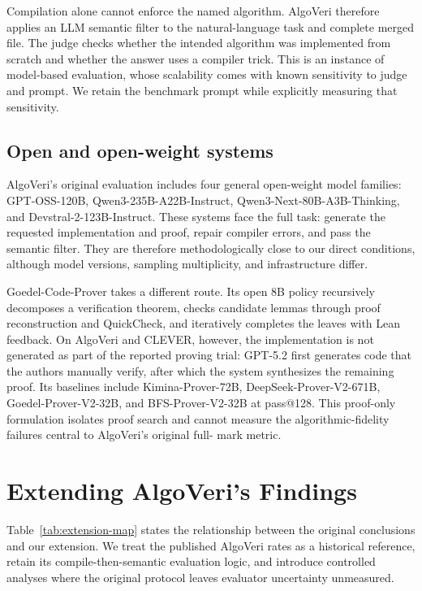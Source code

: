 \documentclass{article}
\begin{document}
Compilation alone cannot enforce the named algorithm.  AlgoVeri therefore applies an
LLM semantic filter to the natural-language task and complete merged file.  The judge
checks whether the intended algorithm was implemented from scratch and whether the
answer uses a compiler trick.  This is an instance of model-based evaluation, whose
scalability comes with known sensitivity to judge and prompt\cite{zheng2023llmjudge}.
We retain the benchmark prompt while explicitly measuring that sensitivity.

\subsection{Open and open-weight systems}

AlgoVeri's original evaluation includes four general open-weight model families:
GPT-OSS-120B, Qwen3-235B-A22B-Instruct, Qwen3-Next-80B-A3B-Thinking, and
Devstral-2-123B-Instruct\cite{zhao2026algoveri}.  These systems face the full task:
generate the requested implementation and proof, repair compiler errors, and pass the
semantic filter.  They are therefore methodologically close to our direct conditions,
although model versions, sampling multiplicity, and infrastructure differ.

Goedel-Code-Prover takes a different route\cite{li2026goedelcodeprover}.  Its open 8B
policy recursively decomposes a verification theorem, checks candidate lemmas through
proof reconstruction and QuickCheck, and iteratively completes the leaves with Lean
feedback.  On AlgoVeri and CLEVER, however, the implementation is not generated as part
of the reported proving trial: GPT-5.2 first generates code that the authors manually
verify, after which the system synthesizes the remaining proof.  Its baselines include
Kimina-Prover-72B, DeepSeek-Prover-V2-671B, Goedel-Prover-V2-32B, and
BFS-Prover-V2-32B at pass@128.  This proof-only formulation isolates proof search and
cannot measure the algorithmic-fidelity failures central to AlgoVeri's original full-
mark metric.

\section{Extending AlgoVeri's Findings}
\label{sec:extension-framework}

Table~\ref{tab:extension-map} states the relationship between the original conclusions
and our extension.  We treat the published AlgoVeri rates as a historical reference,
retain its compile-then-semantic evaluation logic, and introduce controlled analyses
where the original protocol leaves evaluator uncertainty unmeasured.
\end{document}
